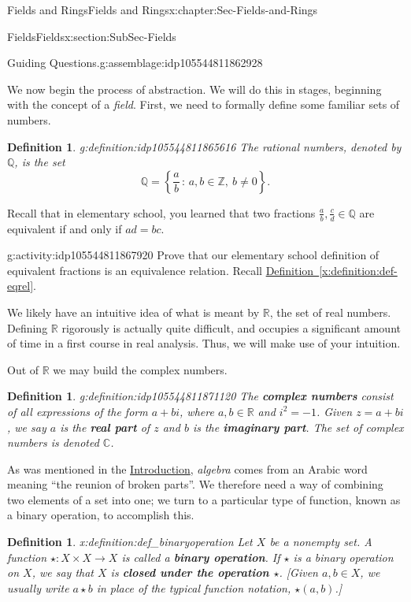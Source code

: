 \documentclass[oneside,10pt,]{book}
\newcommand{\xreffont}{\relax}
\newcommand{\terminology}[1]{\textbf{#1}}
\numberwithin{equation}{section}
\newcommand{\setof}[2]{{\left\{#1\,\colon\,#2\right\}}}
\def\C{{\mathbb C}}
\def\Z{{\mathbb Z}}
\def\Q{{\mathbb Q}}
\def\R{{\mathbb R}}
\newtheorem{definition}[theorem]{Definition}
\begin{document}
\begin{chapterptx}{Fields and Rings}{}{Fields and Rings}{}{}{x:chapter:Sec-Fields-and-Rings}
\begin{sectionptx}{Fields}{}{Fields}{}{}{x:section:SubSec-Fields}
\begin{assemblage}{Guiding Questions.}{g:assemblage:idp105544811862928}
%
\end{assemblage}
We now begin the process of abstraction. We will do this in stages, beginning with the concept of a \emph{field}. First, we need to formally define some familiar sets of numbers.%
\begin{definition}{}{g:definition:idp105544811865616}%
The rational numbers, denoted by \(\Q\), is the set%
\begin{equation*}
\Q = \setof{\frac{a}{b}}{a,b\in \Z, \ b\ne 0}\text{.}
\end{equation*}
%
\end{definition}
Recall that in elementary school, you learned that two fractions \(\frac{a}{b}, \frac{c}{d} \in \Q\) are equivalent if and only if \(ad=bc\).%
\begin{activity}{}{g:activity:idp105544811867920}%
Prove that our elementary school definition of equivalent fractions is an equivalence relation. Recall \hyperref[x:definition:def-eqrel]{Definition~{\xreffont\ref{x:definition:def-eqrel}}}.%
\end{activity}%
We likely have an intuitive idea of what is meant by \(\R\), the set of real numbers. Defining \(\R\) rigorously is actually quite difficult, and occupies a significant amount of time in a first course in real analysis. Thus, we will make use of your intuition. %
\par
Out of \(\R\) we may build the complex numbers.%
\begin{definition}{}{g:definition:idp105544811871120}%
The \terminology{complex numbers} consist of all expressions of the form \(a+bi\), where \(a,b\in \R\) and \(i^2 = -1\). Given \(z = a+bi\), we say \(a\) is the \terminology{real part} of \(z\) and \(b\) is the \terminology{imaginary part}. The set of complex numbers is denoted \(\C\).%
\end{definition}
As was mentioned in the \hyperref[x:preface:Sec-Introduction]{Introduction}, \emph{algebra} comes from an Arabic word meaning ``the reunion of broken parts''. We therefore need a way of combining two elements of a set into one; we turn to a particular type of function, known as a binary operation, to accomplish this.%
\begin{definition}{}{x:definition:def_binaryoperation}%
%
 Let \(X\) be a nonempty set. A function \(\star : X \times X \to X\) is called a \terminology{binary operation}. If \(\star\) is a binary operation on \(X\), we say that \(X\) is \terminology{closed under the operation \(\star\)}. [Given \(a,b\in X\), we usually write \(a\star b\) in place of the typical function notation, \(\star(a,b)\).]%

\end{definition}
\end{sectionptx}
\end{chapterptx}
\end{document}
